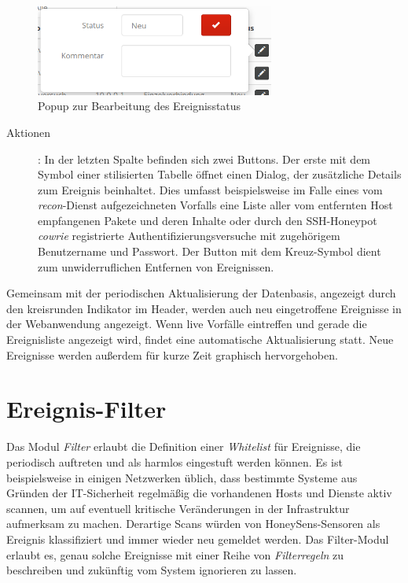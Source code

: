 \documentclass[12pt]{article}
\begin{document}
\begin{figure}[h]
				\centering
				\includegraphics[width=0.7\textwidth]{./graphics/events-status.png}
				\caption{Popup zur Bearbeitung des Ereignisstatus}
				\label{fig:events-status}
\end{figure}

\begin{description}
				\item[Aktionen]: In der letzten Spalte befinden sich zwei Buttons. Der erste mit dem Symbol einer stilisierten Tabelle öffnet einen Dialog, der zusätzliche Details zum Ereignis beinhaltet. Dies umfasst beispielsweise im Falle eines vom \textit{recon}-Dienst aufgezeichneten Vorfalls eine Liste aller vom entfernten Host empfangenen Pakete und deren Inhalte oder durch den SSH-Honeypot \textit{cowrie} registrierte Authentifizierungsversuche mit zugehörigem Benutzername und Passwort. Der Button mit dem Kreuz-Symbol dient zum unwiderruflichen Entfernen von Ereignissen.
\end{description}

Gemeinsam mit der periodischen Aktualisierung der Datenbasis, angezeigt durch den kreisrunden Indikator im Header, werden auch neu eingetroffene Ereignisse in der Webanwendung angezeigt. Wenn live Vorfälle eintreffen und gerade die Ereignisliste angezeigt wird, findet eine automatische Aktualisierung statt. Neue Ereignisse werden außerdem für kurze Zeit graphisch hervorgehoben.

\section{Ereignis-Filter}
Das Modul \textit{Filter} erlaubt die Definition einer \textit{Whitelist} für Ereignisse, die periodisch auftreten und als harmlos eingestuft werden können. Es ist beispielsweise in einigen Netzwerken üblich, dass bestimmte Systeme aus Gründen der IT-Sicherheit regelmäßig die vorhandenen Hosts und Dienste aktiv scannen, um auf eventuell kritische Veränderungen in der Infrastruktur aufmerksam zu machen. Derartige Scans würden von HoneySens-Sensoren als Ereignis klassifiziert und immer wieder neu gemeldet werden. Das Filter-Modul erlaubt es, genau solche Ereignisse mit einer Reihe von \textit{Filterregeln} zu beschreiben und zukünftig vom System ignorieren zu lassen.
\end{document}
